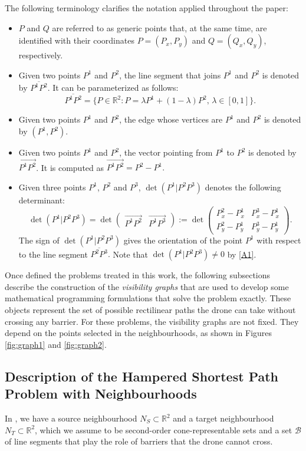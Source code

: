 \documentclass[a4paper,  review, authoryear, 1p.]{elsarticle}
\newcommand{\SPPN}{{\sf{H-SPPN}\xspace }}
\newcommand{\CV}[1]{{\color{red}#1}}
\newcommand{\segment}[2]{\overline{#1#2}}
\newcommand{\determinant}[3]{\det({#1|#2#3})}
\begin{document}
	The following terminology clarifies the notation applied throughout the paper: 
	\begin{itemize}
		\item $P$ and $Q$ are referred to as generic points that, at the same time, are identified with their coordinates $P=(P_x, P_y)$ and $Q=(Q_x, Q_y)$, respectively.
		\item Given two points $P^1$ and $P^2$, the line segment that joins $P^1$ and $P^2$ is denoted by $\segment{P^1}{P^2}$. It can be parameterized as follows:
		$$\segment{P^1}{P^2}=\{P\in\mathbb R^2:P=\lambda P^1 + (1-\lambda)P^2,\,\lambda\in[0,1]\}.$$
		\item  Given two points $P^1$ and $P^2$, the edge whose vertices are $P^1$ and $P^2$ is denoted by $(P^1, P^2)$.
		\item  Given two points $P^1$ and $P^2$, the vector pointing from $P^1$ to $P^2$ is denoted by $\overrightarrow{P^1P^2}$. It is computed as
		$\overrightarrow{P^1P^2}=P^2-P^1.$
		\item Given three points $P^1$, $P^2$ and $P^3$, $\determinant{P^1}{P^2}{P^3}$ denotes the following determinant:
		$$
		\determinant{P^1}{P^2}{P^3}=\det\left(\begin{array}{c|c} \overrightarrow{P^1P^2} & \overrightarrow{P^1P^3}\end{array}\right):=\det\left( \begin{array}{cc}  P^2_x-P^1_x & P^3_x-P^1_x \\ P_y^2-P^1_y & P_y^3-P_y^1 \end{array}\right).
		$$
		The sign of $\determinant{P^1}{P^2}{P^3}$ gives the orientation of the point $P^1$ with respect to the line segment $\segment{P^2}{P^3}.$ Note that $\determinant{P^1}{P^2}{P^3}\neq 0$ by \ref{A1}. 
	\end{itemize}
	
	\CV{Once defined the problems treated in this work, the following subsections describe the construction of the \emph{visibility graphs} that are used to develop some mathematical programming formulations that solve the problem exactly. These objects represent the set of possible rectilinear paths the drone can take without crossing any barrier. For these problems, the visibility graphs are not fixed. They depend on the points selected in the neighbourhoods, as shown in Figures \ref{fig:graph1} and \ref{fig:graph2}}.
	
	
	\subsection{Description of the Hampered Shortest Path Problem with Neighbourhoods}\label{subsection:descriptionHSPPN}
	In \SPPN, we have a source neighbourhood $N_S\subset\mathbb R^2$ and a target neighbourhood $N_T\subset\mathbb R^2$, which we assume to be second-order cone-representable sets and a set $\mathcal B$ of line segments that play the role of barriers that the drone cannot cross. 
	
\end{document}
